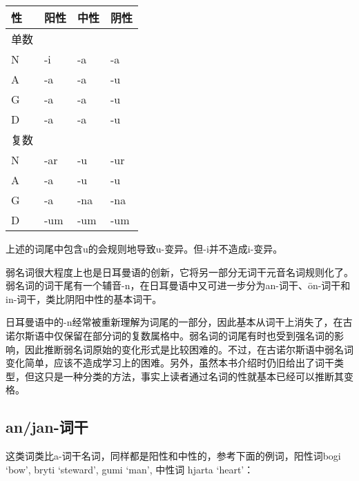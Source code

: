 \begin{longtable}{llll}
  \toprule
  \textbf{性} & \textbf{阳性} & \textbf{中性} & \textbf{阴性} \\
  \midrule
  \endhead
  \bottomrule
  \endfoot
  单数        &               &               &               \\
  N           & -i            & -a            & -a            \\
  A           & -a            & -a            & -u            \\
  G           & -a            & -a            & -u            \\
  D           & -a            & -a            & -u            \\
  复数        &               &               &               \\
  N           & -ar           & -u            & -ur           \\
  A           & -a            & -u            & -u            \\
  G           & -a            & -na           & -na           \\
  D           & -um           & -um           & -um           \\
\end{longtable}

上述的词尾中包含u的会规则地导致u-变异。但-i并不造成i-变异。

弱名词很大程度上也是日耳曼语的创新，它将另一部分无词干元音名词规则化了。弱名词的词干尾有一个辅音-n，在日耳曼语中又可进一步分为an-词干、ōn-词干和in-词干，类比阴阳中性的基本词干。

日耳曼语中的-n经常被重新理解为词尾的一部分，因此基本从词干上消失了，在古诺尔斯语中仅保留在部分词的复数属格中。弱名词的词尾有时也受到强名词的影响，因此推断弱名词原始的变化形式是比较困难的。不过，在古诺尔斯语中弱名词变化简单，应该不造成学习上的困难。另外，虽然本书介绍时仍旧给出了词干类型，但这只是一种分类的方法，事实上读者通过名词的性就基本已经可以推断其变格。

\subsection{an/jan-词干}
\label{an/jan-词干}

这类词类比a-词干名词，同样都是阳性和中性的，参考下面的例词，阳性词bogi
`bow', bryti `steward', gumi `man', 中性词 hjarta `heart'：

